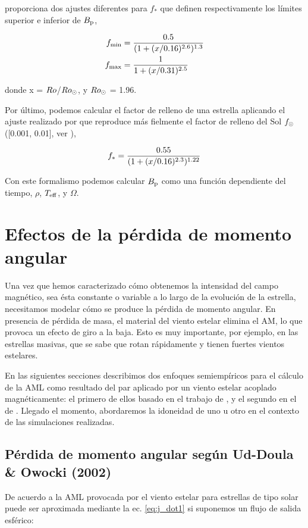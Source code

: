 \cite{Cranmer2011} proporciona dos ajustes diferentes para $f_*$ que definen respectivamente los límites superior e inferior de $B_{\mathrm{p}}$,

\begin{align}
	f_{\mathrm{min}} &= \frac{0.5}{(1+(x/0.16)^{2.6})^{1.3}} \label{eq:fmin}\\
	f_{\mathrm{max}} &= \frac{1}{1+(x/0.31)^{2.5}} \label{eq:fmax}
\end{align}

donde x = $Ro$/$Ro_\odot$, y $Ro_\odot$ = 1.96. \par

Por último, podemos calcular el factor de relleno de una estrella aplicando el ajuste realizado por \cite{Gallet2013} que reproduce más fielmente el factor de relleno del Sol $f_{\mathrm{\odot}}$ ([0.001, 0.01], ver \cite{Cranmer2011}),

\begin{equation}
	f_{\mathrm{*}} = \frac{0.55}{(1+(x/0.16)^{2.3})^{1.22}} \label{eq:fstart}
\end{equation}

Con este formalismo podemos calcular $B_{\mathrm{p}}$ como una función dependiente del tiempo, $\rho$, $T_{\mathrm{eff}}$, y $\Omega$.\par

\section{Efectos de la pérdida de momento angular}
Una vez que hemos caracterizado cómo obtenemos la intensidad del campo magnético, sea ésta constante o variable a lo largo de la evolución de la estrella, necesitamos modelar cómo se produce la pérdida de momento angular. En presencia de pérdida de masa, el material del viento estelar elimina el AM, lo que provoca un efecto de giro a la baja. Esto es muy importante, por ejemplo, en las estrellas masivas, que se sabe que rotan rápidamente y tienen fuertes vientos estelares. 

En las siguientes secciones describimos dos enfoques semiempíricos para el cálculo de la AML como resultado del par aplicado por un viento estelar acoplado magnéticamente: el primero de ellos basado en el trabajo de \cite{Weber1967}, y el segundo en el de \cite{Gallet2013}. Llegado el momento, abordaremos la idoneidad de uno u otro en el contexto de las simulaciones realizadas.\par

\subsection{Pérdida de momento angular según Ud-Doula \& Owocki (2002)}
De acuerdo a \cite{Weber1967} la AML provocada por el viento estelar para estrellas de tipo solar puede ser aproximada mediante la ec. \ref{eq:j_dot1} si suponemos un flujo de salida esférico:

